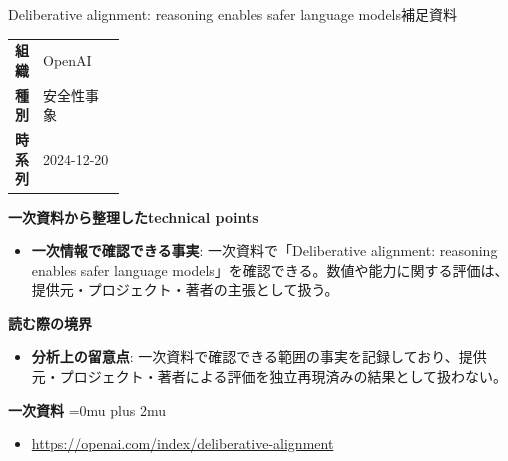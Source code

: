 \begin{technicalnote}{Deliberative alignment: reasoning enables safer language models}{補足資料}
\begingroup
\begin{tabularx}{\linewidth}{@{}>{\bfseries}p{0.22\linewidth}X@{}}
組織 & OpenAI \\
種別 & 安全性事象 \\
時系列 & 2024-12-20 \\
\end{tabularx}
\smallskip
{\bfseries 一次資料から整理したtechnical points}
\begin{itemize}[leftmargin=1.5em,itemsep=0.35em]
\item \textbf{一次情報で確認できる事実}: 一次資料で「Deliberative alignment: reasoning enables safer language models」を確認できる。数値や能力に関する評価は、提供元・プロジェクト・著者の主張として扱う。
\end{itemize}
\begin{minipage}{\linewidth}
{\bfseries 読む際の境界}
\begin{itemize}[leftmargin=1.5em,itemsep=0.35em]
\item \textbf{分析上の留意点}: 一次資料で確認できる範囲の事実を記録しており、提供元・プロジェクト・著者による評価を独立再現済みの結果として扱わない。
\end{itemize}
\begin{samepage}
{\bfseries 一次資料}
\begingroup\sloppy
\Urlmuskip=0mu plus 2mu\relax
\begin{itemize}[leftmargin=1.5em,itemsep=0.25em]
\item {\scriptsize\url{https://openai.com/index/deliberative-alignment}}
\end{itemize}
\endgroup
\end{samepage}
\end{minipage}
\endgroup
\end{technicalnote}
\medskip
